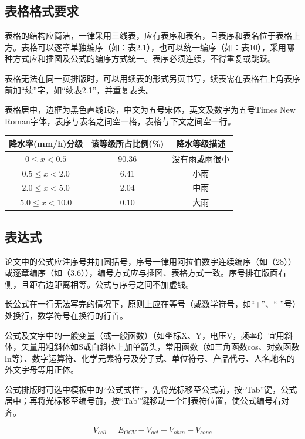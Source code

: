 \documentclass{seuthesis-2022}
\begin{document}
\subsection{表格格式要求}
表格的结构应简洁，一律采用三线表，应有表序和表名，且表序和表名位于表格上方。表格可以逐章单独编序（如：表2.1），也可以统一编序（如：表10），采用哪种方式应和插图及公式的编序方式统一。表序必须连续，不得重复或跳跃。

表格无法在同一页排版时，可以用续表的形式另页书写，续表需在表格右上角表序前加“续”字，如“续表2.1”，并重复表头。

表格居中，边框为黑色直线1磅，中文为五号宋体，英文及数字为五号Times New Roman字体，表序与表名之间空一格，表格与下文之间空一行。

\begin{table}
  \centering
  \begin{tabular}{ccc}
    \toprule
    降水率(mm/h)分级 & 该等级所占比例(\%) & 降水等级描述\\
    \midrule
    $0\le x< 0.5$ & 90.36 & 没有雨或雨很小\\
    $0.5\le x< 2.0$ & 6.41 & 小雨\\
    $2.0\le x< 5.0$ & 2.04 & 中雨\\
    $5.0\le x< 10.0$ & 0.10 & 大雨\\
    \bottomrule
  \end{tabular}
\end{table}

\subsection{表达式}
论文中的公式应注序号并加圆括号，序号一律用阿拉伯数字连续编序（如（28））或逐章编序（如（3.6）），编号方式应与插图、表格方式一致。序号排在版面右侧，且距右边距离相等。公式与序号之间不加虚线。

长公式在一行无法写完的情况下，原则上应在等号（或数学符号，如“+”、“-”号）处换行，数学符号在换行的行首。

公式及文字中的一般变量（或一般函数）（如坐标X、Y，电压V，频率f）宜用斜体，矢量用粗斜体如S或白斜体上加单箭头，常用函数（如三角函数cos、对数函数ln等）、数字运算符、化学元素符号及分子式、单位符号、产品代号、人名地名的外文字母等用正体。

公式排版时可选中模板中的“公式式样”，先将光标移至公式前，按“Tab”键，公式居中；再将光标移至编号前，按“Tab”键移动一个制表符位置，使公式编号右对齐。

\begin{equation}
V_{cell}=E_{OCV}-V_{oct}-V_{ohm}-V_{conc}
\end{equation}
  
\end{document}
